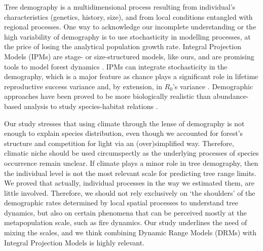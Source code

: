 Tree demography is a multidimensional process resulting from individual's characteristics (\eg genetics, history, size), and from local conditions entangled with regional processes. One way to acknowledge our incomplete understanding or the high variability of demography is to use stochasticity in modelling processes, at the price of losing the analytical population growth rate. Integral Projection Models (IPMs) are stage- or size-structured models, like ours, and are promising tools to model forest dynamics \citep{Vindenes2012, Kunstler2019, Merow2014}. IPMs can integrate stochasticity in the demography, which is a major feature as chance plays a significant role in lifetime reproductive success variance and, by extension, in $ R_0 $'s variance \citep{Snyder2016, Snyder2018}. Demographic approaches have been proved to be more biologically realistic than abundance-based analysis to study species-habitat relations \citep{Bin2016}. 

Our study stresses that using climate through the lense of demography is not enough to explain species distribution, even though we accounted for forest's structure and competition for light via an (over)simplified way. Therefore, climatic niche should be used circumspectly as the underlying processes of species occurrence remain unclear. If climate plays a minor role in tree demography, then the individual level is not the most relevant scale for predicting tree range limits. We proved that actually, individual processes in the way we estimated them, are little involved. Therefore, we should not rely exclusively on `the shoulders' of the demographic rates determined by local spatial processes to understand tree dynamics, but also on certain phenomena that can be perceived mostly at the metapopulation scale, such as fire dynamics. Our study underlines the need of mixing the scales, and we think combining Dynamic Range Models (DRMs) with Integral Projection Models is highly relevant.
